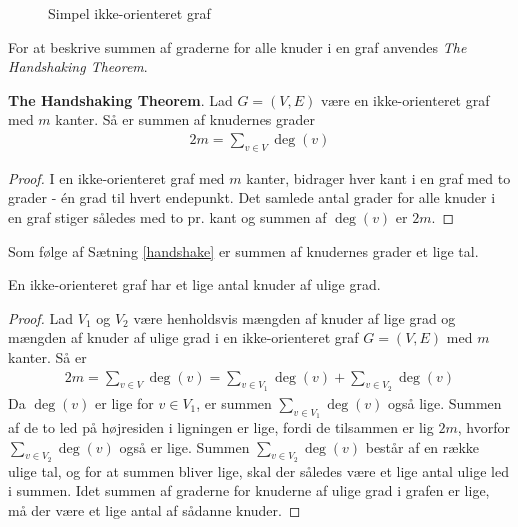\begin{figure}[h]
	\centering
	
	\caption{Simpel ikke-orienteret graf} \label{eksempel_nabo}
\end{figure}

For at beskrive summen af graderne for alle knuder i en graf anvendes \textit{The Handshaking Theorem}. 

\begin{thm}\label{handshake}
	\textbf{The Handshaking Theorem}.
	Lad $G=(V,E)$ være en ikke-orienteret graf med $m$ kanter.
	Så er summen af knudernes grader
	\begin{align*}
		2m=\sum_{v \in V}\deg(v)
	\end{align*}
\end{thm}

\begin{proof}
	I en ikke-orienteret graf med $m$ kanter, bidrager hver kant i en graf med to grader - én grad til hvert endepunkt.
	Det samlede antal grader for alle knuder i en graf stiger således med to pr. kant og summen af $\deg(v)$ er $2m$. 
\end{proof}

Som følge af Sætning \ref{handshake} er summen af knudernes grader et lige tal.

\begin{thm}
	En ikke-orienteret graf har et lige antal knuder af ulige grad.
\end{thm}

\begin{proof}
	Lad $V_1$ og $V_2$ være henholdsvis mængden af knuder af lige grad og mængden af knuder af ulige grad i en ikke-orienteret graf $G=(V,E)$ med $m$ kanter.
	Så er
	\begin{align*}
		2m=\sum_{v \in V}\deg(v)=\sum_{v \in V_1}\deg(v)+ \sum_{v \in V_2}\deg(v)
	\end{align*}
	Da $\deg(v)$ er lige for $v \in V_1$, er summen $\sum_{v \in V_1}\deg(v)$ også lige.
	Summen af de to led på højresiden i ligningen er lige, fordi de tilsammen er lig $2m$, hvorfor $\sum_{v \in V_2}\deg(v)$ også er lige.
	Summen $\sum_{v \in V_2}\deg(v)$ består af en række ulige tal, og for at summen bliver lige, skal der således være et lige antal ulige led i summen.
	Idet summen af graderne for knuderne af ulige grad i grafen er lige, må der være et lige antal af sådanne knuder.
\end{proof}


